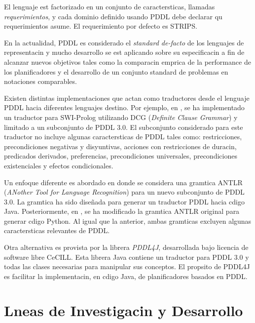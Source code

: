 \documentclass[a4paper,12pt,twocolumn]{article}
\begin{document}
El lenguaje est factorizado en un conjunto de caractersticas, llamadas \emph{requerimientos}, y cada dominio definido usando PDDL debe declarar qu requerimientos asume. El requerimiento por defecto es STRIPS.

En la actualidad, PDDL es considerado el \emph{standard de-facto} de los lenguajes de representacin y mucho desarrollo se est aplicando sobre su especificacin a fin de alcanzar nuevos objetivos tales como la comparacin emprica de la performance de los planificadores y el desarrollo de un conjunto standard de problemas en notaciones comparables.

Existen distintas implementaciones que actan como traductores desde el lenguaje PDDL hacia diferentes lenguajes destino.
Por ejemplo, en \cite{gbraun:prolog}, se ha implementado un traductor para SWI-Prolog utilizando DCG (\emph{Definite Clause Grammar}) y limitado a un subconjunto de PDDL 3.0\cite{gbraun:pddl30}. El subconjunto considerado para este traductor no incluye algunas caractersticas de PDDL tales como: restricciones, precondiciones negativas y disyuntivas, acciones con restricciones de duracin, predicados derivados, preferencias, precondiciones universales, precondiciones existenciales y efectos condicionales. 

Un enfoque diferente es abordado en \cite{gbraun:antlr1} donde se considera una gramtica ANTLR (\emph{ANother Tool for Language Recognition})\cite{gbraun:antlrtool} para un nuevo subconjunto de PDDL 3.0. La gramtica ha sido dise\~{n}ada para generar un traductor PDDL hacia cdigo Java. Posteriormente, en \cite{gbraun:antlr2}, se ha modificado la gramtica ANTLR original para generar cdigo Python. Al igual que la anterior, ambas gramticas excluyen algunas 
caractersticas relevantes de PDDL.

Otra alternativa es provista por la librera \emph{PDDL4J}\cite{gbraun:java},
desarrollada bajo licencia de software libre CeCILL\cite{gbraun:cecill}. Esta librera Java contiene un traductor para PDDL 3.0 y todas las clases necesarias para manipular sus conceptos. El propsito de PDDL4J es facilitar la implementacin, en cdigo Java, de planificadores basados en PDDL.


\section{Lneas de Investigacin y Desarrollo}
\label{sec:lineas-invest}
\end{document}
